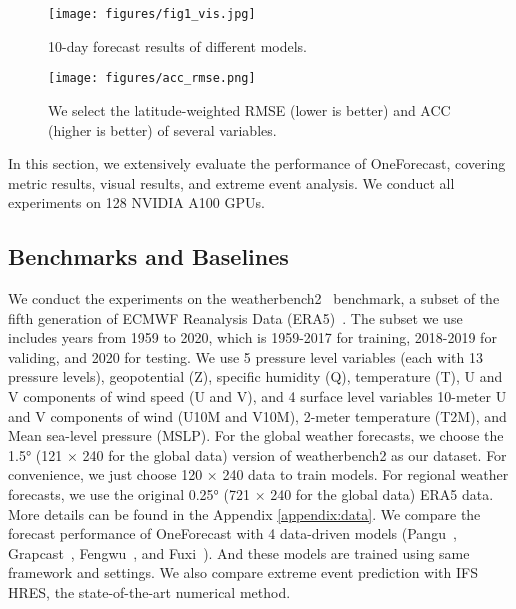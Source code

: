 \begin{figure*}[h]
\centering
\texttt{[image: figures/fig1\_vis.jpg]}
\vspace{-20pt}
\caption{10-day forecast results of different models.}
\label{fig:visual_results}
\vspace{-15pt}
\end{figure*}

\begin{figure*}[h]
        \centering
        \texttt{[image: figures/acc\_rmse.png]}
        \vspace{-20pt}
        \caption{We select the latitude-weighted RMSE (lower is better) and ACC (higher is better) of several variables.}
        \label{fig:acc_rmse}
\vspace{-10pt}
\end{figure*}


    In this section, we extensively evaluate the performance of OneForecast, covering metric results, visual results, and extreme event analysis. We conduct all experiments on 128 NVIDIA A100 GPUs.

\subsection{Benchmarks and Baselines}
    We conduct the experiments on the weatherbench2~\cite{rasp2024weatherbench} benchmark, a subset of the fifth generation of ECMWF Reanalysis Data (ERA5)~\cite{hersbach2020era5}. The subset we use includes years from 1959 to 2020, which is 1959-2017 for training, 2018-2019 for validing, and 2020 for testing. We use 5 pressure level variables (each with 13 pressure levels), geopotential (Z), specific humidity (Q), temperature (T), U and V components of wind speed (U and V), and 4 surface level variables 10-meter U and V components of wind (U10M and V10M), 2-meter temperature (T2M), and Mean sea-level pressure (MSLP). For the global weather forecasts, we choose the 1.5° (121 × 240 for the global data) version of weatherbench2 as our dataset. For convenience, we just choose 120 × 240 data to train models. For regional weather forecasts, we use the original 0.25° (721 × 240 for the global data) ERA5 data.  More details can be found in the Appendix \ref{appendix:data}. We compare the forecast performance of OneForecast with 4 data-driven models (Pangu~\cite{bi2023accurate}, Grapcast~\cite{lam2023learning}, Fengwu~\cite{chen2023fengwu}, and Fuxi~\cite{chen2023fuxi}). And these models are trained using same framework and settings. We also compare extreme event prediction with IFS HRES, the state-of-the-art numerical method.

